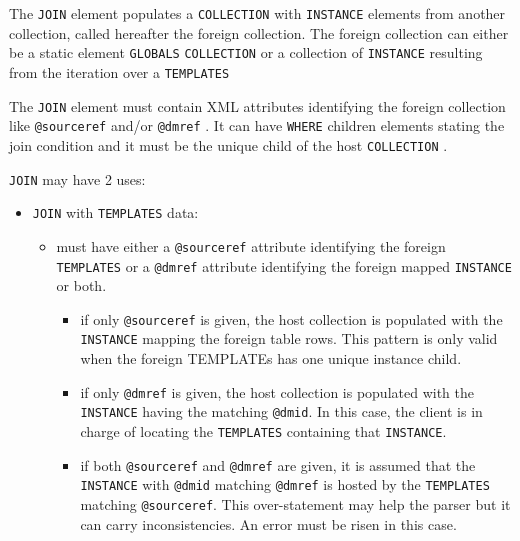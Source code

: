 The \texttt{JOIN} element populates a \texttt{COLLECTION} with \texttt{INSTANCE}  elements from another collection, called hereafter the foreign collection.
The foreign collection can either be a static element  \texttt{GLOBALS} \texttt{COLLECTION}  or a collection of \texttt{INSTANCE}  resulting from the iteration over a \texttt{TEMPLATES} 

The \texttt{JOIN} element must contain XML attributes identifying the foreign collection  like \texttt{@sourceref}  and/or \texttt{@dmref} . 
It can have \texttt{WHERE} children elements stating the join condition and it must be the unique child of the host \texttt{COLLECTION} .

 \texttt{JOIN} may have 2 uses:

\begin{itemize}

    \item \texttt{JOIN}  with \texttt{TEMPLATES} data:
       \begin{itemize}
         \item must have either a \texttt{@sourceref} attribute identifying the foreign \texttt{TEMPLATES} or a \texttt{@dmref} attribute identifying the foreign mapped \texttt{INSTANCE} or both.
             \begin{itemize}
               \item if only \texttt{@sourceref} is given, the host collection is populated with the \texttt{INSTANCE}  mapping the foreign table rows. 
                        This pattern is only valid when the foreign TEMPLATEs has  one unique instance child.
               \item if only \texttt{@dmref} is given,  the host collection is populated with the \texttt{INSTANCE}  having the matching \texttt{@dmid}. In this case, 
                        the client is in charge of locating the \texttt{TEMPLATES} containing that \texttt{INSTANCE}.
               \item if both \texttt{@sourceref} and \texttt{@dmref} are given, it is assumed that the \texttt{INSTANCE} with \texttt{@dmid} matching \texttt{@dmref} is hosted by the \texttt{TEMPLATES} matching \texttt{@sourceref}.
                        This over-statement may help the parser but it can carry inconsistencies. An error must be risen in this case.
             \end{itemize}
    \end{itemize}
  

\end{itemize}
